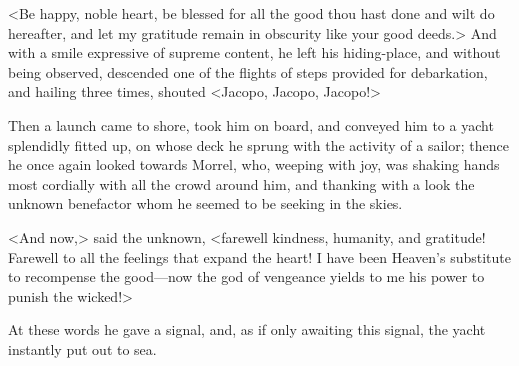  <Be happy, noble heart, be blessed for all the good thou hast done and wilt do hereafter, and let my gratitude remain in obscurity like your good deeds.>  And with a smile expressive of supreme content, he left his hiding-place, and without being observed, descended one of the flights of steps provided for debarkation, and hailing three times, shouted <Jacopo, Jacopo, Jacopo!> 

 Then a launch came to shore, took him on board, and conveyed him to a yacht splendidly fitted up, on whose deck he sprung with the activity of a sailor; thence he once again looked towards Morrel, who, weeping with joy, was shaking hands most cordially with all the crowd around him, and thanking with a look the unknown benefactor whom he seemed to be seeking in the skies. 

 <And now,> said the unknown, <farewell kindness, humanity, and gratitude! Farewell to all the feelings that expand the heart! I have been Heaven's substitute to recompense the good—now the god of vengeance yields to me his power to punish the wicked!> 

 At these words he gave a signal, and, as if only awaiting this signal, the yacht instantly put out to sea. 